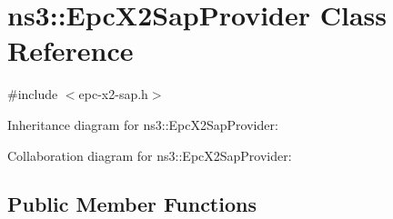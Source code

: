\hypertarget{classns3_1_1EpcX2SapProvider}{}\section{ns3\+:\+:Epc\+X2\+Sap\+Provider Class Reference}
\label{classns3_1_1EpcX2SapProvider}


{\ttfamily \#include $<$epc-\/x2-\/sap.\+h$>$}



Inheritance diagram for ns3\+:\+:Epc\+X2\+Sap\+Provider\+:


Collaboration diagram for ns3\+:\+:Epc\+X2\+Sap\+Provider\+:
\subsection*{Public Member Functions}
